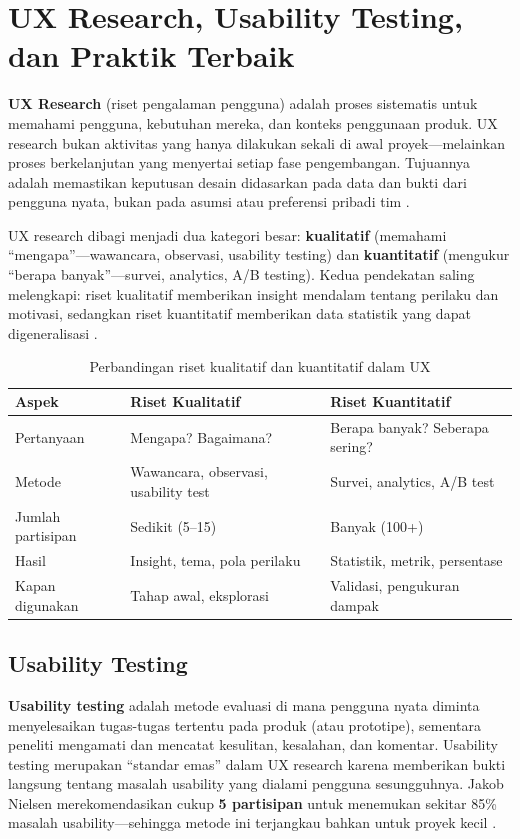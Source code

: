\section{UX Research, Usability Testing, dan Praktik Terbaik}

\textbf{UX Research} (riset pengalaman pengguna) adalah proses sistematis untuk memahami pengguna, kebutuhan mereka, dan konteks penggunaan produk. UX research bukan aktivitas yang hanya dilakukan sekali di awal proyek---melainkan proses berkelanjutan yang menyertai setiap fase pengembangan. Tujuannya adalah memastikan keputusan desain didasarkan pada data dan bukti dari pengguna nyata, bukan pada asumsi atau preferensi pribadi tim \cite{nngroup}.

UX research dibagi menjadi dua kategori besar: \textbf{kualitatif} (memahami ``mengapa''---wawancara, observasi, usability testing) dan \textbf{kuantitatif} (mengukur ``berapa banyak''---survei, analytics, A/B testing). Kedua pendekatan saling melengkapi: riset kualitatif memberikan insight mendalam tentang perilaku dan motivasi, sedangkan riset kuantitatif memberikan data statistik yang dapat digeneralisasi \cite{ixdf}.

\begin{table}[htbp]
\centering
\begin{tabular}{|P{3cm}|P{4.5cm}|P{4.5cm}|}
\hline
\textbf{Aspek} & \textbf{Riset Kualitatif} & \textbf{Riset Kuantitatif} \\
\hline
Pertanyaan & Mengapa? Bagaimana? & Berapa banyak? Seberapa sering? \\
\hline
Metode & Wawancara, observasi, usability test & Survei, analytics, A/B test \\
\hline
Jumlah partisipan & Sedikit (5--15) & Banyak (100+) \\
\hline
Hasil & Insight, tema, pola perilaku & Statistik, metrik, persentase \\
\hline
Kapan digunakan & Tahap awal, eksplorasi & Validasi, pengukuran dampak \\
\hline
\end{tabular}
\caption{Perbandingan riset kualitatif dan kuantitatif dalam UX}
\end{table}

\subsection{Usability Testing}

\textbf{Usability testing} adalah metode evaluasi di mana pengguna nyata diminta menyelesaikan tugas-tugas tertentu pada produk (atau prototipe), sementara peneliti mengamati dan mencatat kesulitan, kesalahan, dan komentar. Usability testing merupakan ``standar emas'' dalam UX research karena memberikan bukti langsung tentang masalah usability yang dialami pengguna sesungguhnya. Jakob Nielsen merekomendasikan cukup \textbf{5 partisipan} untuk menemukan sekitar 85\% masalah usability---sehingga metode ini terjangkau bahkan untuk proyek kecil \cite{nngroup}.

